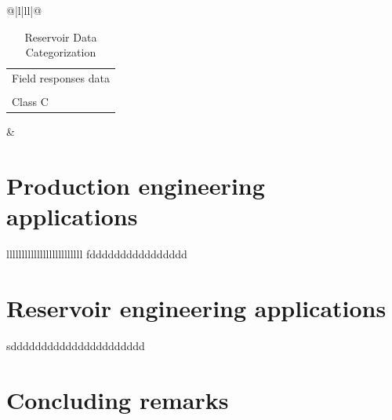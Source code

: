 \begin{table}[]
{\begin{tabular}{@{}|l|ll|@{}}
   \\ \midrule
\begin{tabular}[c]{@{}l@{}}Field responses data\\    \\ Class C\end{tabular} &
   \\ \bottomrule
\end{tabular}%
}
\caption{Reservoir Data Categorization}
\label{reservoir_data}
\end{table}

\section{Production engineering applications}
lllllllllllllllllllllllll
fdddddddddddddddd
\section{Reservoir engineering applications}
sdddddddddddddddddddddd

\section{Concluding remarks}
